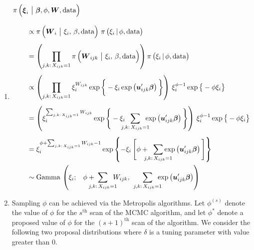 \documentclass[11pt]{article}
\renewcommand{\vec}{\boldsymbol}
\newcommand{\barS}{\,|\,}
\newcommand{\barM}{~\big|~}
\begin{document}
\begin{enumerate}[label=Step \arabic*., leftmargin=13mm, itemsep=10mm]
\item 
\begin{align*} \MoveEqLeft
\pi\, \Big( \vec{\xi}_i \barM \vec{\beta}, \phi, \vec{W}, \text{data} \Big) \\[2ex]
&\propto \pi\,\Big( \vec{W}_i \barM \xi_i,\, \beta, \text{data} \Big)~ \pi\, \big( \xi_i \barS \phi, \text{data} \big) \\[1ex]
&= \left( \prod_{j,k{:}\, X_{ijk}=1} \pi\,\Big( \vec{W}_{ijk} \barM \xi_i,\, \beta, \text{data} \Big) \right) \pi\, \big( \xi_i \barS \phi, \text{data} \big) \\[1ex]
&\propto \left( \prod_{j,k{:}\, X_{ijk}=1} \xi_i^{W_{ijk}} \exp\bigg\{ -\xi_i \exp\left( \vec{u}_{ijk}^\prime \vec{\beta} \right) \bigg\} \right)\, \xi_i^{\phi - 1} \exp\big\{ -\phi \xi_i \big\} \\[1ex]
&= \left( \xi_i^{\sum_{j,k{:}\, X_{ijk}=1} W_{ijk}} \exp\Bigg\{ -\xi_i \hspace{2mm} \sum_{\mathclap{ j,k{:}\, X_{ijk}=1 }} \hspace{2mm} \exp\left( \vec{u}_{ijk}^\prime \vec{\beta} \right) \Bigg\} \right)\, \xi_i^{\phi - 1} \exp\big\{ -\phi \xi_i \big\} \\[1ex]
&= \xi_i^{ \phi + \sum_{j,k{:}\, X_{ijk}=1} W_{ijk} - 1 } \exp\left\{ -\xi_i\, \Bigg[ \phi + \hspace{2mm} \sum_{\mathclap{ j,k{:}\, X_{ijk}=1 }} \exp\left( \vec{u}_{ijk}^\prime \vec{\beta} \right) \Bigg] \right\} \\
& \sim \text{Gamma}\,\left(\xi_i; \hspace{3mm} \phi + \hspace{1mm} \sum_{\mathclap{ j,k{:}\, X_{ijk}=1 }} \hspace{2mm} W_{ijk}, \hspace{6mm} \sum_{\mathclap{ j,k{:}\, X_{ijk}=1 }}\hspace{2mm} \exp\left( \vec{u}_{ijk}^\prime \vec{\beta} \right) \right)
\end{align*}






\item Sampling $\phi$ can be achieved via the Metropolis algorithms.  Let $\phi^{(s)}$ denote the value of $\phi$ for the $s^{\text{th}}$ scan of the MCMC algorithm, and let $\phi^*$ denote a proposed value of $\phi$ for the $(s+1)^{\text{th}}$ scan of the algorithm.  We consider the following two proposal distributions where $\delta$ is a tuning parameter with value greater than 0. \vspace{2mm}


\end{enumerate}
\end{document}

